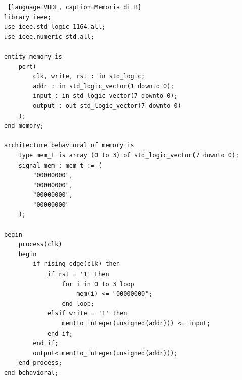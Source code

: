 \begin{lstlisting} [language=VHDL, caption=Memoria di B]
library ieee;
use ieee.std_logic_1164.all;
use ieee.numeric_std.all;

entity memory is
    port(
        clk, write, rst : in std_logic;
        addr : in std_logic_vector(1 downto 0);
        input : in std_logic_vector(7 downto 0);
        output : out std_logic_vector(7 downto 0)
    );
end memory;

architecture behavioral of memory is
    type mem_t is array (0 to 3) of std_logic_vector(7 downto 0);
    signal mem : mem_t := (
        "00000000",
        "00000000",
        "00000000",
        "00000000"
    );

begin
    process(clk)
    begin
        if rising_edge(clk) then
            if rst = '1' then
                for i in 0 to 3 loop
                    mem(i) <= "00000000";
                end loop;
            elsif write = '1' then
                mem(to_integer(unsigned(addr))) <= input;
            end if;
        end if;
        output<=mem(to_integer(unsigned(addr)));
    end process;
end behavioral;
\end{lstlisting}

